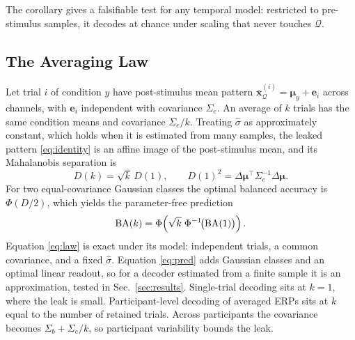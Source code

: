 The corollary gives a falsifiable test for any temporal model: restricted to pre-stimulus samples, it decodes at chance under scaling that never touches $\mathcal{Q}$.

\subsection{The Averaging Law}
Let trial $i$ of condition $y$ have post-stimulus mean pattern $\bar{\mathbf{x}}^{(i)}_\mathcal{Q}=\boldsymbol\mu_y+\mathbf{e}_i$ across channels, with $\mathbf{e}_i$ independent with covariance $\Sigma_e$. An average of $k$ trials has the same condition means and covariance $\Sigma_e/k$. Treating $\hat\sigma$ as approximately constant, which holds when it is estimated from many samples, the leaked pattern \eqref{eq:identity} is an affine image of the post-stimulus mean, and its Mahalanobis separation is
\begin{equation}
D(k)=\sqrt{k}\,D(1),\qquad D(1)^2=\Delta\boldsymbol\mu^\top\Sigma_e^{-1}\Delta\boldsymbol\mu. \label{eq:law}
\end{equation}
For two equal-covariance Gaussian classes the optimal balanced accuracy is $\Phi(D/2)$, which yields the parameter-free prediction
\begin{equation}
\mathrm{BA}(k)=\Phi\!\left(\sqrt{k}\;\Phi^{-1}\!\big(\mathrm{BA}(1)\big)\right). \label{eq:pred}
\end{equation}
Equation \eqref{eq:law} is exact under its model: independent trials, a common covariance, and a fixed $\hat\sigma$. Equation \eqref{eq:pred} adds Gaussian classes and an optimal linear readout, so for a decoder estimated from a finite sample it is an approximation, tested in Sec.~\ref{sec:results}. Single-trial decoding sits at $k=1$, where the leak is small. Participant-level decoding of averaged ERPs sits at $k$ equal to the number of retained trials. Across participants the covariance becomes $\Sigma_b+\Sigma_e/k$, so participant variability bounds the leak.
